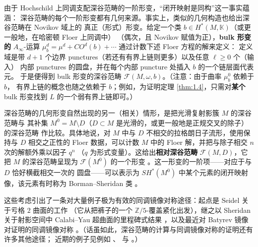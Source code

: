 \documentclass[UTF8,a4paper,11pt,fontset=windows]{ctexart}
\theoremstyle{cnthm}
\numberwithin{equation}{section}
\newcommand{\Z}{\mathbb{Z}}
\newcommand{\KK}{\mathbb{K}}          %
\newcommand{\SH}{SH}                  %
\newcommand{\FF}{\mathcal{F}}         %
\begin{document}
由于 Hochschild 上同调支配深谷范畴的一阶形变，“闭开映射是同构”这一事实蕴涵：
深谷范畴的每个一阶形变都有几何来源。事实上，类似的几何构造也给出深谷范畴在 Novikov 域上的
真正（形式）形变。给定一个类 $b\in H^{*}(M,\KK)$（或更一般地，在哈密顿 Floer 上同调中）
（偶次，且 Novikov 赋值为正），\textbf{bulk 形变的} $A_\infty$-运算
$\mu^{d}_{b}=\mu^{d}+CO^{d}(b)+\cdots$ 通过计数下述 Floer 方程的解来定义：
定义域是带 $d+1$ 个边界 punctures（若还有有界上链则更多）以及任意 $\ell\ge0$ 个（输入）
内部 punctures 的圆盘，并在每个内部 puncture 处插入 $b$ 的一个链层面代表元。
于是便得到 bulk 形变的深谷范畴 $\FF(M,\omega,b)$。（注意：由于曲率 $\mu^{0}_{b}$ 依赖于 $b$，
有界上链的概念也随之依赖于 $b$；例如，为证明定理 \ref{thm:1.4}，只需对\textbf{某个}
bulk 形变找到 $L$ 的一个弱有界上链即可。）


深谷范畴的几何形变自然出现的另一（相关）情形，是把光滑复射影簇 $M$ 的深谷范畴与
其补集 $M^{0}=M\setminus D$（$D\subset M$ 是光滑的，或更一般地是正规交叉的除子）的深谷范畴
作比较。具体地说，对 $M$ 中与 $D$ 不相交的拉格朗日子流形，使用保持与 $D$ 相交之正性的
Floer 数据，可以计数 $M$ 中的 Floer 解，并把与除子相交 $n$ 次的解额外乘以因子 $q^{n}$
（$q$ 为形式变量）。这给出\textbf{相对深谷范畴} $\FF(M,D)$，它把 $M$ 的深谷范畴呈现为
$\FF(M^{0})$ 的一个形变 \cite{r91,r84}。这一形变的一阶项——对应于与 $D$ 恰好横截相交一次的
圆盘——可以表示为 $\SH^{*}(M^{0})$ 中某个元素的闭开映射像，该元素有时称为
Borman--Sheridan 类 \cite{r29}。

这些考虑引出了一条对大量例子极为有效的同调镜像对称途径：起点是 Seidel 关于亏格 $2$ 曲面的工作
\cite{r94}（它从把裤子的一个 $\Z/5$-覆盖紧化出发），继之以 Sheridan 关于射影空间中
Calabi--Yau 超曲面的里程碑式结果 \cite{r95}，以及最近对 Batyrev 镜像对证明的同调镜像对称
\cite{r55}。（话虽如此，深谷范畴的计算与同调镜像对称的证明还有许多其他途径；
近期的例子见例如 \cite{r69}、\cite{r6} 与 \cite{r101}。）
\end{document}
